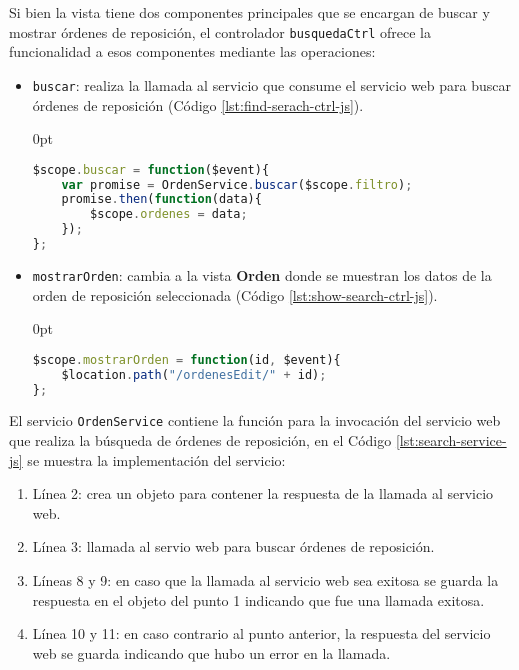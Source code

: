 \begin{enumerate}
Si bien la vista tiene dos componentes principales que se encargan de buscar y mostrar órdenes de reposición, el controlador \texttt{busquedaCtrl} ofrece la funcionalidad a esos componentes mediante las operaciones:
\begin{itemize}
	\item \texttt{buscar}: realiza la llamada al servicio que consume el servicio web para buscar órdenes de reposición (Código \ref{lst:find-serach-ctrl-js}).
\begin{adjustwidth}{\listingfixlargewidth}{0pt}
\begin{lstlisting}[language=Javascript, caption={Función para llamar el servicio de búsqueda de órdenes de reposición.}, captionpos=b, label={lst:find-serach-ctrl-js}]
$scope.buscar = function($event){
	var promise = OrdenService.buscar($scope.filtro);
	promise.then(function(data){
		$scope.ordenes = data;
	});
};
\end{lstlisting}
\end{adjustwidth}

	\item \texttt{mostrarOrden}: cambia a la vista \textbf{Orden} donde se muestran los datos de la orden de reposición seleccionada (Código \ref{lst:show-search-ctrl-js}).
\begin{adjustwidth}{\listingfixlargewidth}{0pt}
\begin{lstlisting}[language=Javascript, caption={Función para mostrar la vista de una orden de reposición.}, captionpos=b, label={lst:show-search-ctrl-js}]
$scope.mostrarOrden = function(id, $event){
	$location.path("/ordenesEdit/" + id);
};
\end{lstlisting}
\end{adjustwidth}
\end{itemize}

El servicio \texttt{OrdenService} contiene la función para la invocación del servicio web que realiza la búsqueda de órdenes de reposición, en el Código \ref{lst:search-service-js} se muestra la implementación del servicio:
\begin{enumerate}
	\item Línea 2: crea un objeto para contener la respuesta de la llamada al servicio web.
	\item Línea 3: llamada al servio web para buscar órdenes de reposición.
	\item Líneas 8 y 9: en caso que la llamada al servicio web sea exitosa se guarda la respuesta en el objeto del punto 1 indicando que fue una llamada exitosa.
	\item Línea 10 y 11: en caso contrario al punto anterior, la respuesta del servicio web se guarda indicando que hubo un error en la llamada.
\end{enumerate}



\end{enumerate}
